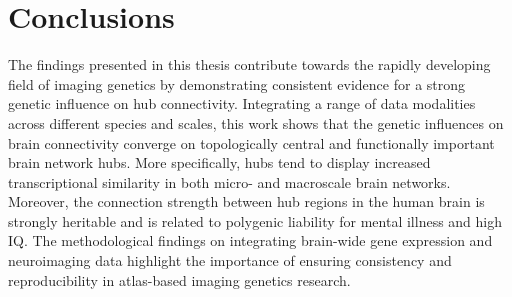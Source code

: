 \newpage
\section{Conclusions}

The findings presented in this thesis contribute towards the rapidly developing field of imaging genetics by demonstrating consistent evidence for a strong genetic influence on hub connectivity. Integrating a range of data modalities across different species and scales, this work shows that the genetic influences on brain connectivity converge on topologically central and functionally important brain network hubs. More specifically, hubs tend to display increased transcriptional similarity in both micro- and macroscale brain networks. Moreover, the connection strength between hub regions in the human brain is strongly heritable and is related to polygenic liability for mental illness and high IQ. The methodological findings on integrating brain-wide gene expression and neuroimaging data highlight the importance of ensuring consistency and reproducibility in atlas-based imaging genetics research.
